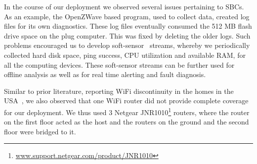 \documentclass[10pt]{sensys-proc}
\newcommand{\figref}[1]{Figure~\ref{#1}}
\newcommand{\secref}[1]{Section~\ref{#1}}
\newcommand{\paradigm}{Sense-Local Store-Upload}
\begin{document}




In the course of our deployment we observed several issues pertaining to SBCs. As an example, the OpenZWave based program, used to collect data, created log files for its own diagnostics. These log files eventually consumed the 512 MB flash drive space on the plug computer. This was fixed by deleting the older logs. Such problems encouraged us to develop soft-sensor~\cite{softgreen} streams, whereby we periodically collected hard disk space, ping success, CPU utilization and available RAM, for all the computing devices. These soft-sensor streams can be further used for offline analysis as well as for real time alerting and fault diagnosis. %

Similar to prior literature, reporting WiFi discontinuity in the homes in the USA~\cite{hitchhiker_residential}, we also observed that one WiFi router did not provide complete coverage for our deployment. We thus used 3 Netgear JNR1010\footnote{\url{www.support.netgear.com/product/JNR1010}} routers, where the router on the first floor acted as the host and the routers on the ground and the second floor were bridged to it. %
\end{document}
